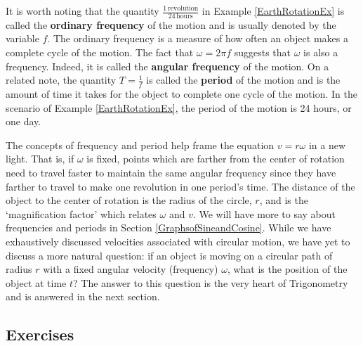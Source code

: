 \documentclass{ximera}
\begin{document}
It is worth noting that the quantity $\frac{1 \, \text{revolution}}{24 \, \text{hours}}$ in Example \ref{EarthRotationEx} is called the   \textbf{ordinary frequency} of the motion and is usually denoted by the variable $f$.  The ordinary frequency is a measure of how often an object makes a complete cycle of the motion.  The fact that $\omega = 2\pi f$ suggests that $\omega$ is also a frequency.  Indeed, it is called the   \textbf{angular frequency} of the motion.  On a related note, the quantity $T = \frac{1}{f}$ is called the \textbf{period} of the motion and is the amount of time it takes for the object to complete one cycle of the motion.  In the scenario of Example \ref{EarthRotationEx}, the period of the motion is 24 hours, or one day.  

\smallskip

The concepts of frequency and period help frame the equation $v = r \omega$ in a new light.  That is, if $\omega$ is fixed, points which are farther from the center of rotation need to travel faster to maintain the same angular frequency since they have farther to travel to make one revolution in one period's time.  The distance of the object to the center of rotation is the radius of the circle, $r$, and is the `magnification factor' which relates $\omega$ and $v$. We will have more to say about frequencies and periods in Section \ref{GraphsofSineandCosine}.  While we have exhaustively discussed velocities associated with circular motion, we have yet to discuss a more natural question: if an object is moving on a circular path of radius $r$ with a fixed angular velocity (frequency) $\omega$, what is the position of the object at time $t$?  The answer to this question is the very heart of Trigonometry and is answered in the next section.   

\newpage

\subsection{Exercises}



\closegraphsfile
\end{document}
